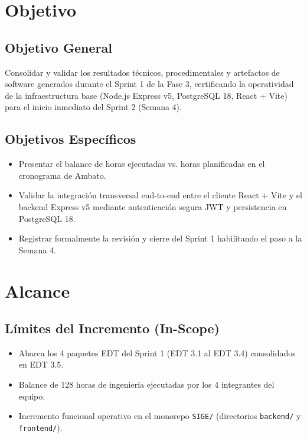 \documentclass[12pt,a4paper]{article}
\begin{document}
\section{Objetivo}

\subsection{Objetivo General}
Consolidar y validar los resultados técnicos, procedimentales y artefactos de software generados durante el Sprint 1 de la Fase 3, certificando la operatividad de la infraestructura base (Node.js Express v5, PostgreSQL 18, React + Vite) para el inicio inmediato del Sprint 2 (Semana 4).

\subsection{Objetivos Específicos}
\begin{itemize}[leftmargin=1.5em, itemsep=1.5pt, topsep=1.5pt]
    \item Presentar el balance de horas ejecutadas vs. horas planificadas en el cronograma de Ambato.
    \item Validar la integración transversal end-to-end entre el cliente React + Vite y el backend Express v5 mediante autenticación segura JWT y persistencia en PostgreSQL 18.
    \item Registrar formalmente la revisión y cierre del Sprint 1 habilitando el paso a la Semana 4.
\end{itemize}

\section{Alcance}

\subsection{Límites del Incremento (In-Scope)}
\begin{itemize}[leftmargin=1.5em, itemsep=1.5pt]
    \item Abarca los 4 paquetes EDT del Sprint 1 (EDT 3.1 al EDT 3.4) consolidados en EDT 3.5.
    \item Balance de 128 horas de ingeniería ejecutadas por los 4 integrantes del equipo.
    \item Incremento funcional operativo en el monorepo \texttt{SIGE/} (directorios \texttt{backend/} y \texttt{frontend/}).
\end{itemize}
\end{document}
